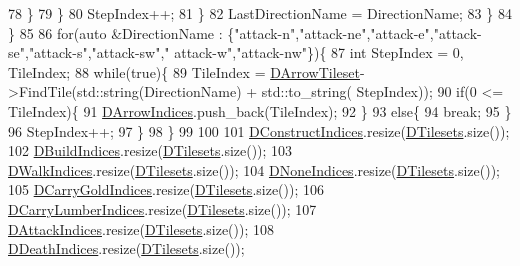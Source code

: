 \begin{DoxyCode}
78                     \}
79                 \}
80                 StepIndex++;
81             \}
82             LastDirectionName = DirectionName;
83         \}   
84     \}
85     
86     \textcolor{keywordflow}{for}(\textcolor{keyword}{auto} &DirectionName : \{\textcolor{stringliteral}{"attack-n"},\textcolor{stringliteral}{"attack-ne"},\textcolor{stringliteral}{"attack-e"},\textcolor{stringliteral}{"attack-se"},\textcolor{stringliteral}{"attack-s"},\textcolor{stringliteral}{"attack-sw"},\textcolor{stringliteral}{"
      attack-w"},\textcolor{stringliteral}{"attack-nw"}\})\{
87         \textcolor{keywordtype}{int} StepIndex = 0, TileIndex;
88         \textcolor{keywordflow}{while}(\textcolor{keyword}{true})\{
89             TileIndex = \hyperlink{classCAssetRenderer_a2aa6a3a0e3ae05b3165f88dcd216ffc6}{DArrowTileset}->FindTile(std::string(DirectionName) + std::to\_string(
      StepIndex));
90             \textcolor{keywordflow}{if}(0 <= TileIndex)\{
91                 \hyperlink{classCAssetRenderer_a7bc2bb5c49d9ed462f5d9dec8bc3b939}{DArrowIndices}.push\_back(TileIndex);
92             \}
93             \textcolor{keywordflow}{else}\{
94                 \textcolor{keywordflow}{break};   
95             \}
96             StepIndex++;
97         \}
98     \}  
99     
100     
101     \hyperlink{classCAssetRenderer_a1790a8f6992efbb3fea59dde42a3cacb}{DConstructIndices}.resize(\hyperlink{classCAssetRenderer_ae8201de704851c1de6424a8da77b785e}{DTilesets}.size());
102     \hyperlink{classCAssetRenderer_aa892b01d11bef2aca7491461eb97dffb}{DBuildIndices}.resize(\hyperlink{classCAssetRenderer_ae8201de704851c1de6424a8da77b785e}{DTilesets}.size());
103     \hyperlink{classCAssetRenderer_a9975fd583c826c9905ccd080659bd3c5}{DWalkIndices}.resize(\hyperlink{classCAssetRenderer_ae8201de704851c1de6424a8da77b785e}{DTilesets}.size());
104     \hyperlink{classCAssetRenderer_adfa7285e46e798a7d34a935bc7a6df6c}{DNoneIndices}.resize(\hyperlink{classCAssetRenderer_ae8201de704851c1de6424a8da77b785e}{DTilesets}.size());
105     \hyperlink{classCAssetRenderer_aaf8c772b7d3fbe8c145282e5106749d6}{DCarryGoldIndices}.resize(\hyperlink{classCAssetRenderer_ae8201de704851c1de6424a8da77b785e}{DTilesets}.size());
106     \hyperlink{classCAssetRenderer_a986dc401334deb267cb772ff0650fcb6}{DCarryLumberIndices}.resize(\hyperlink{classCAssetRenderer_ae8201de704851c1de6424a8da77b785e}{DTilesets}.size());
107     \hyperlink{classCAssetRenderer_acc2d0fab5a9f1f35a1d5eaf28ff743cc}{DAttackIndices}.resize(\hyperlink{classCAssetRenderer_ae8201de704851c1de6424a8da77b785e}{DTilesets}.size());
108     \hyperlink{classCAssetRenderer_a31be8b0e563072ee1168ab11154d15c8}{DDeathIndices}.resize(\hyperlink{classCAssetRenderer_ae8201de704851c1de6424a8da77b785e}{DTilesets}.size());

\end{DoxyCode}

